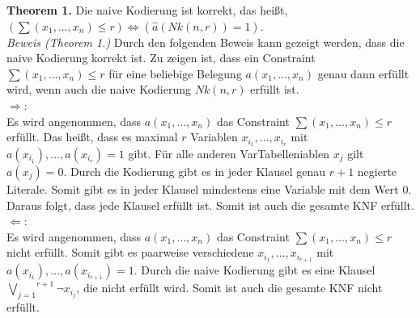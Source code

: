 \documentclass[a4,abstract=on]{scrartcl}
\begin{document}
\textbf{Theorem 1.} Die naive Kodierung ist korrekt, das heißt, $(\sum (x_1, \dots, x_n) \leq r) \Leftrightarrow (\hat{a} (Nk(n,r)) = 1)$.\\
\newline
\textit{Beweis (Theorem 1.)} Durch den folgenden Beweis kann gezeigt werden, dass die naive Kodierung korrekt ist. Zu zeigen ist, dass ein Constraint $\sum(x_1, \dots,x_n) \leq r$ für eine beliebige Belegung $a(x_1, \dots ,x_n)$ genau dann erfüllt wird, wenn auch die naive Kodierung $Nk(n, r)$ erfüllt ist.\\
\glqq$\Rightarrow$\grqq:\\
Es wird angenommen, dass $a(x_1, \dots ,x_n)$ das Constraint $\sum(x_1, \dots,x_n) \leq r$ erfüllt. Das heißt, dass es maximal $r$ Variablen $x_{i_1}, \dots, x_{i_r}$ mit $a(x_{i_1}), \dots ,a(x_{i_r}) = 1$ gibt. Für alle anderen VarTabelleniablen $x_j$ gilt $a(x_j) = 0$. Durch die Kodierung gibt es in jeder Klausel genau $r+1$ negierte Literale. Somit gibt es in jeder Klausel mindestens eine Variable mit dem Wert $0$. Daraus folgt, dass jede Klausel erfüllt ist. Somit ist auch die gesamte KNF erfüllt.\\
\glqq$\Leftarrow$\grqq:\\
Es wird angenommen, dass $a(x_1, \dots ,x_n)$ das Constraint $\sum(x_1, \dots,x_n) \leq r$ nicht erfüllt. Somit gibt es paarweise verschiedene $x_{i_1}, \dots, x_{i_{r+1}}$ mit $a(x_{i_1}), \dots ,a(x_{i_{r+1}}) = 1$. Durch die naive Kodierung gibt es eine Klausel $\overset{r+1}{\underset{j=1}{\bigvee}} {\neg x_{i_j}}$, die nicht erfüllt wird. Somit ist auch die gesamte KNF nicht erfüllt.\\
 \qedsymbol
\end{document}
